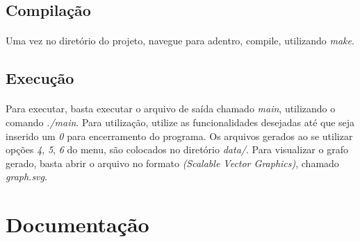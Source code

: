 \documentclass{article}
\begin{document}
			\subsection{Compilação}
				\paragraph{} Uma vez no diretório do projeto, navegue para adentro, compile, utilizando {\it make}.

			\subsection{Execução}
				\paragraph{} Para executar, basta executar o arquivo de saída chamado {\it main}, utilizando o comando {\it ./main}. Para utilização, utilize as funcionalidades desejadas até que seja inserido um {\it 0} para encerramento do programa. Os arquivos gerados ao se utilizar opções {\it 4}, {\it 5}, {\it 6} do menu, são colocados no diretório {\it data/}. Para visualizar o grafo gerado, basta abrir o arquivo no formato {\it (Scalable Vector Graphics)}, chamado {\it graph.svg}.

    \section{Documentação}
\end{document}

